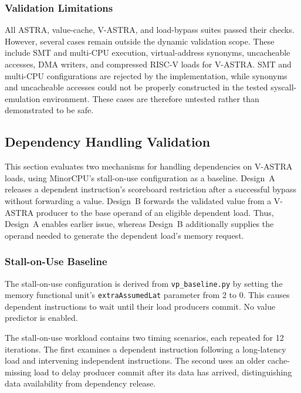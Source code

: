 \subsubsection{Validation Limitations}
\label{subsubsec:astra-vastra-provenance}

All ASTRA, value-cache, V-ASTRA, and load-bypass suites passed
their checks. However, several cases remain outside the dynamic
validation scope. These include SMT and multi-CPU execution,
virtual-address synonyms, uncacheable accesses, DMA writers, and
compressed RISC-V loads for V-ASTRA. SMT and multi-CPU configurations
are rejected by the implementation, while synonyms and uncacheable
accesses could not be properly constructed in the tested
syscall-emulation environment. These cases are therefore untested
rather than demonstrated to be safe.

\subsection{Dependency Handling Validation}
\label{subsec:dependency-handling-validation}

This section evaluates two mechanisms for handling dependencies on
V-ASTRA loads, using MinorCPU's stall-on-use configuration as a
baseline. Design~A releases a dependent instruction's scoreboard
restriction after a successful bypass without forwarding a value.
Design~B forwards the validated value from a V-ASTRA producer to
the base operand of an eligible dependent load. Thus, Design~A
enables earlier issue, whereas Design~B additionally supplies the
operand needed to generate the dependent load's memory request.

\subsubsection{Stall-on-Use Baseline}
\label{subsubsec:stall-on-use-validation}

The stall-on-use configuration is derived from
\texttt{vp\_baseline.py} by setting the memory functional unit's
\texttt{extraAssumedLat} parameter from 2 to 0. This causes dependent
instructions to wait until their load producers commit. No value
predictor is enabled.

The stall-on-use workload contains two timing scenarios,
each repeated for 12 iterations. The first examines a dependent
instruction following a long-latency load and intervening independent
instructions. The second uses an older cache-missing load to delay
producer commit after its data has arrived, distinguishing data
availability from dependency release.


